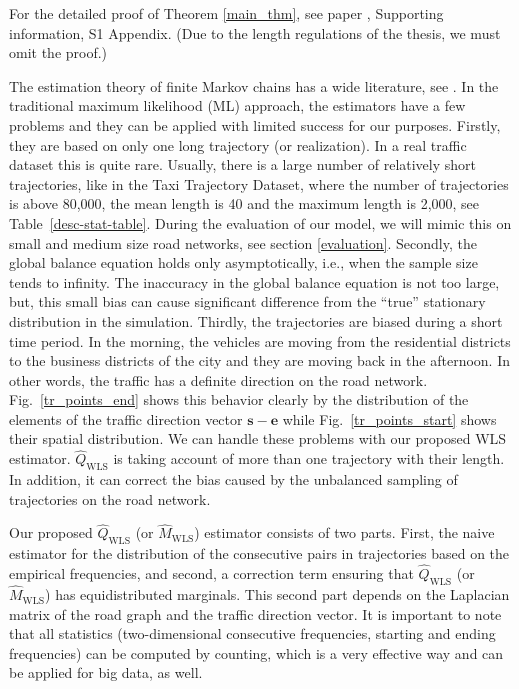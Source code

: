 \documentclass[b5paper,12pt]{report}
\theoremstyle{definition}
\newcommand{\be}{\boldsymbol{e}}
\newcommand{\bs}{\boldsymbol{s}}
\begin{document}
For the detailed proof of Theorem \ref{main_thm}, see paper \cite{traffic-paper}, Supporting information, S1 Appendix. (Due to the length regulations of the thesis, we must omit the proof.)

The estimation theory of finite Markov chains has a wide literature, see \cite{billingsley1961}. In the traditional maximum likelihood (ML) approach, the estimators have a few problems and they can be applied with limited success for our purposes. Firstly, they are based on only one long trajectory (or realization). In a real traffic dataset this is quite rare. Usually, there is a large number of relatively short trajectories, like in the Taxi Trajectory Dataset, where the number of trajectories is above 80,000, the mean length is 40 and the maximum length is 2,000, see Table~\ref{desc-stat-table}. During the evaluation of our model, we will mimic this on small and medium size road networks, see section \ref{evaluation}. Secondly, the global balance equation holds only asymptotically, i.e., when the sample size tends to infinity. The inaccuracy in the global balance equation is not too large, but, this small bias can cause significant difference from the \enquote{true} stationary distribution in the simulation. Thirdly, the trajectories are biased during a short time period. In the morning, the vehicles are moving from the residential districts to the business districts of the city and they are moving back in the afternoon. In other words, the traffic has a definite direction on the road network. Fig.~\ref{tr_points_end} shows this behavior clearly by the distribution of the elements of the traffic direction vector $\bs-\be$ while Fig.~\ref{tr_points_start} shows their spatial distribution. We can handle these problems with our proposed WLS estimator. $\widehat{Q}_{\textrm{WLS}}$ is taking account of more than one trajectory with their length. In addition, it can correct the bias caused by the unbalanced sampling of trajectories on the road network.

Our proposed $\widehat{Q}_{\textrm{WLS}}$ (or $\widehat{M}_{\textrm{WLS}}$) estimator consists of two parts. First, the naive estimator for the distribution of the consecutive pairs in trajectories based on the empirical frequencies, and second, a correction term ensuring that $\widehat{Q}_{\textrm{WLS}}$ (or $\widehat{M}_{\textrm{WLS}}$) has equidistributed marginals. This second part depends on the Laplacian matrix of the road graph and the traffic direction vector. It is important to note that all statistics (two-dimensional consecutive frequencies, starting and ending frequencies) can be computed by counting, which is a very effective way and can be applied for big data, as well.
\end{document}
